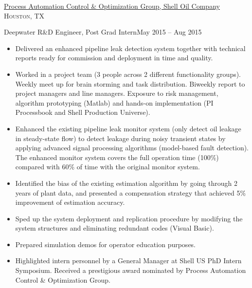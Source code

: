 \documentclass[10pt,a4paper]{article}
\begin{document}
  \headedsection
  {\href{http://sites.psu.edu/jinyuxie/internship-project/}{Process Automation Control \& Optimization Group, Shell Oil Company}}
  {\textsc{Houston, TX}}
  {
    \headedsubsection
    {Deepwater R\&D Engineer, Post Grad Intern}{May 2015 -- Aug 2015}
    {
      \begin{itemize}
      \item Delivered an enhanced pipeline leak detection system together with
        technical reports ready for commission and deployment in time and
        quality. 
        
      \item Worked in a project team (3 people across 2 different functionality
        groups). Weekly meet up for brain storming and task distribution. Biweekly
        report to project managers and line managers. Exposure to risk management,
        algorithm prototyping (Matlab) and hands-on implementation (PI
        Processbook and Shell Production Universe).
        
      \item Enhanced the existing pipeline leak monitor system (only detect
        oil leakage in steady-state flow) to detect leakage during noisy
        transient states by applying advanced signal processing algorithms (model-based fault detection). The enhanced monitor system covers the full operation time
        (100\%) compared with 60\% of time with the original monitor system.  

      \item Identified the bias of the existing estimation algorithm by going
        through 2 years of plant data, and presented a compensation strategy that
        achieved 5\% improvement of estimation accuracy.
        
      \item Sped up the system deployment and replication procedure by modifying the system
        structures and eliminating redundant codes (Visual Basic).
        
      \item Prepared simulation demos for operator education purposes.

      \item Highlighted intern personnel by a General Manager at Shell US PhD
        Intern Symposium. Received a prestigious award nominated by Process
        Automation Control \& Optimization Group. 
        
      \end{itemize}
    }
  }
\end{document}
